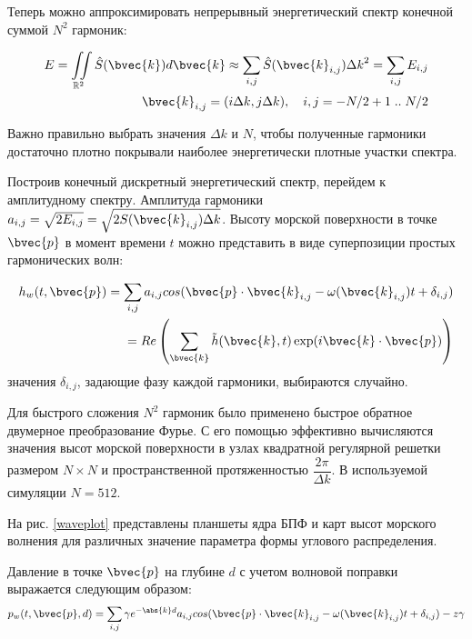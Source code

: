 Теперь можно аппроксимировать непрерывный энергетический спектр конечной суммой $N^2$ гармоник:

\begin{equation}
\label{longe-higgins}
\begin{split}
E = \iint\limits_{\mathbb{R}^2} \hat{S}(\bvec{k})d\bvec{k}
    \approx \sum_{i,j} \hat{S}(\bvec{k}_{i,j}) {\Delta k}^2 
    = \sum_{i,j} E_{i,j}\\
\bvec{k}_{i,j} = (i\Delta k, j\Delta k), \quad i,j = -N/2+1 \; .. \; N/2 
\end{split}
\end{equation}

Важно правильно выбрать значения $\Delta k$ и $N$, чтобы полученные гармоники достаточно плотно покрывали наиболее энергетически плотные участки спектра.

Построив конечный дискретный энергетический спектр, перейдем к амплитудному спектру. Амплитуда гармоники $a_{i,j} = \sqrt{2E_{i,j}} = \sqrt{2S(\bvec{k}_{i,j})\Delta k}$. Высоту морской поверхности в точке $\bvec{p}$ в момент времени $t$ можно представить в виде суперпозиции простых гармонических волн:

\begin{equation}
\label{wave_height}
\begin{split}
h_w(t,\bvec{p}) = \sum_{i,j} a_{i,j}cos(\bvec{p}\cdot \bvec{k}_{i,j} - \omega(\bvec{k}_{i,j})t + \delta_{i,j}) \\
= Re\left( \sum_{\bvec{k}} \tilde{h}(\bvec{k}, t)
 \exp(i\bvec{k} \cdot \bvec{p}) \right)
\end{split}
\end{equation}
значения $\delta_{i,j}$, задающие фазу каждой гармоники, выбираются случайно.

Для быстрого сложения $N^2$ гармоник было применено быстрое обратное двумерное преобразование Фурье. С его помощью эффективно вычисляются значения высот морской поверхности в узлах квадратной регулярной решетки размером $N \times N$ и пространственной протяженностью $\dfrac{2\pi}{\Delta k}$. В используемой симуляции $N = 512$.

На рис. \ref{waveplot} представлены планшеты ядра БПФ и карт высот морского волнения для различных значение параметра формы углового распределения.

Давление в точке $\bvec{p}$ на глубине $d$ с учетом волновой поправки выражается следующим образом:
\begin{equation}
\label{wave_height}
	p_w(t,\bvec{p},d) = \sum_{i,j}
		\gamma e^{-\abs{k}d} 
		a_{i,j}cos(\bvec{p}\cdot \bvec{k}_{i,j} 
		- \omega(\bvec{k}_{i,j})t 
		+ \delta_{i,j}) - z \gamma
\end{equation}

